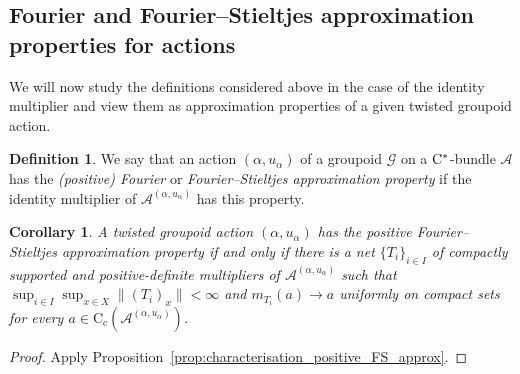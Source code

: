 \documentclass[11 pt, leqno]{amsart}
\numberwithin{equation}{section}
\theoremstyle{plain}
\newtheorem{cor}[thm]{Corollary}
\theoremstyle{definition}
\newtheorem {defn}[thm] {Definition}
\newcommand*{\contc}{\mathrm{C_c}}%
\newcommand{\m}{m}
\newcommand{\G}{\mathcal G} %
\newcommand{\A}{\mathcal A}
\newcommand{\cst}{\ifmmode\mathrm{C}^*\else{$\mathrm{C}^*$}\fi}
\begin{document}
%
\subsection*{Fourier and Fourier--Stieltjes approximation properties for actions}

We will now study the definitions considered above in the case of the identity multiplier and view them as approximation properties of a given twisted groupoid action.

\begin{defn}\label{def:weak_approximation_property_for_actions}
We say that an action $(\alpha,u_{\alpha})$ of a groupoid $\G$ on a $\cst$-bundle $\A$ has the \emph{(positive) Fourier} or \emph{Fourier--Stieltjes approximation property} if the identity multiplier of $\A^{(\alpha,u_{\alpha})}$ has this property. 
\end{defn}

\begin{cor}\label{cor:positive_FS_AP_for_actions}
A twisted groupoid action $(\alpha,u_{\alpha})$ has the positive Fourier--Stieltjes approximation property if and only if there is a net $\{T_{i}\}_{i\in I}$ of compactly supported    and positive-definite multipliers of $\A^{(\alpha,u_{\alpha})}$ such that $\sup_{i\in I}\sup_{x\in X}\|(T_i)_{x}\|<\infty$ and $\m_{T_i}(a)\to a$  uniformly on compact sets for every $a\in\contc(\A^{(\alpha,u_{\alpha})})$.
\end{cor}
\begin{proof} 
Apply Proposition~\ref{prop:characterisation_positive_FS_approx}.
\end{proof}

\end{document}

